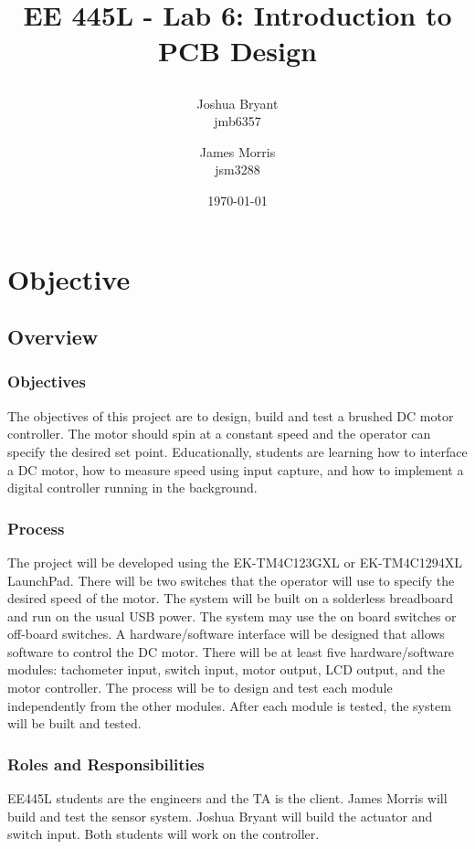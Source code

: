 \documentclass{article}
\title{\begin{LARGE}
	\textbf{EE 445L - Lab 6: Introduction to PCB Design}
\end{LARGE}} %
\author{Joshua Bryant \\ jmb6357 \and James Morris \\ jsm3288} %
\date{\today} %
\begin{document}
\maketitle %


\section{Objective}
	\subsection{Overview}
		\subsubsection{Objectives}
			The objectives of this project are to design, build and test a brushed DC motor controller. The motor should spin at a constant speed and the operator can specify the desired set point. Educationally, students are learning how to interface a DC motor, how to measure speed using input capture, and how to implement a digital controller running in the background.
		\subsubsection{Process}
			The project will be developed using the EK-TM4C123GXL or EK-TM4C1294XL LaunchPad. There will be two switches that the operator will use to specify  the desired speed of the motor. The system will be built on a solderless breadboard and run on the usual USB power. The system may use the on board switches or off-board switches. A hardware/software interface will be designed that allows software to control the DC motor. There will be at least five hardware/software modules: tachometer input, switch input, motor output, LCD output, and the motor controller. The process will be to design and test each module independently from the other modules. After each module is tested, the system will be built and tested.
		\subsubsection{Roles and Responsibilities}
			EE445L students are the engineers and the TA is the client. James Morris will build and test the sensor system. Joshua Bryant will build the actuator and switch input. Both students will work on the controller.
\end{document}
